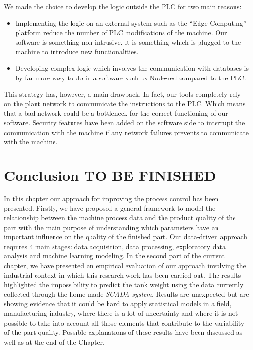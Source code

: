 We made the choice to develop the logic outside the PLC for two main reasons: 

\begin{itemize}
    \item Implementing the logic on an external system such as the “Edge Computing” platform reduce the number of PLC modifications of the machine. Our software is something non-intrusive. It is something which is plugged to the machine to introduce new functionalities.
    \item Developing complex logic which involves the communication with databases is by far more easy to do in a software such us Node-red compared to the PLC.
\end{itemize}

This strategy has, however, a main drawback. In fact, our tools completely rely on the plant network to communicate the instructions to the PLC. Which means that a bad network could be a bottleneck for the correct functioning of our software. Security features have been added on the software side to interrupt the communication with the machine if any network failures prevents to communicate with the machine.     


\section{Conclusion TO BE FINISHED}

In this chapter our approach for improving the process control has been presented. Firstly, we have proposed a general framework to model the relationship between the machine process data and the product quality of the part with the main purpose of understanding which parameters have an important influence on the quality of the finished part. Our data-driven approach requires 4 main stages: data acquisition, data processing, exploratory data analysis and machine learning modeling.  
In the second part of the current chapter, we have presented an empirical evaluation of our approach involving the industrial context in which this research work has been carried out. The results highlighted the impossibility to predict the tank weight using the data currently collected through the home made \textit{SCADA system}. Results are unexpected but are showing evidence that it could be hard to apply statistical models in a field, manufacturing industry, where there is a lot of uncertainty and where it is not possible to take into account all those elements that contribute to the variability of the part quality. Possible explanations of these results have been discussed as well as at the end of the Chapter.

